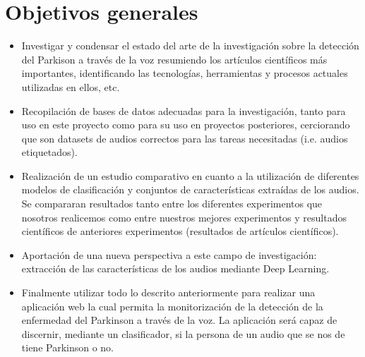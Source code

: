 
\section{Objetivos generales}
\begin{itemize}
	\item Investigar y condensar el estado del arte de la investigación sobre la detección del Parkison a través de la voz resumiendo los artículos científicos más importantes, identificando las tecnologías, herramientas y procesos actuales utilizadas en ellos, etc.
	\item Recopilación de bases de datos adecuadas para la investigación, tanto para uso en este proyecto como para su uso en proyectos posteriores, cerciorando que son datasets de audios correctos para las tareas necesitadas (i.e. audios etiquetados).
	\item Realización de un estudio comparativo en cuanto a la utilización de diferentes modelos de clasificación y conjuntos de características extraídas de los audios. Se compararan resultados tanto entre los diferentes experimentos que nosotros realicemos como entre nuestros mejores experimentos y resultados científicos de anteriores experimentos (resultados de artículos científicos).
	\item Aportación de una nueva perspectiva a este campo de investigación: extracción de las características de los audios mediante Deep Learning.
	\item Finalmente utilizar todo lo descrito anteriormente para realizar una aplicación web la cual permita la monitorización de la detección de la enfermedad del Parkinson a través de la voz. La aplicación será capaz de discernir, mediante un clasificador, si la persona de un audio que se nos de tiene Parkinson o no.
\end{itemize}

